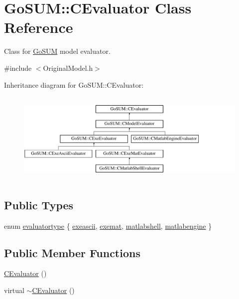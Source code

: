 \hypertarget{class_go_s_u_m_1_1_c_evaluator}{\section{Go\-S\-U\-M\-:\-:C\-Evaluator Class Reference}
\label{class_go_s_u_m_1_1_c_evaluator}
}


Class for \hyperlink{struct_go_s_u_m}{Go\-S\-U\-M} model evaluator.  




{\ttfamily \#include $<$Original\-Model.\-h$>$}

Inheritance diagram for Go\-S\-U\-M\-:\-:C\-Evaluator\-:\begin{figure}[H]
\begin{center}
\leavevmode
\includegraphics[height=4.465710cm]{class_go_s_u_m_1_1_c_evaluator}
\end{center}
\end{figure}
\subsection*{Public Types}
\begin{DoxyCompactItemize}
\item 
enum \hyperlink{class_go_s_u_m_1_1_c_evaluator_a50058cbf6a2c5b94677045ee02b67db2}{evaluatortype} \{ \hyperlink{class_go_s_u_m_1_1_c_evaluator_a50058cbf6a2c5b94677045ee02b67db2aedc52357596b711794cd5bac1aaf813f}{exeascii}, 
\hyperlink{class_go_s_u_m_1_1_c_evaluator_a50058cbf6a2c5b94677045ee02b67db2a0d57d51307eeadeacbfc6714ba003cf6}{exemat}, 
\hyperlink{class_go_s_u_m_1_1_c_evaluator_a50058cbf6a2c5b94677045ee02b67db2a5d73ae80ffe4497b6d5989bf05321da9}{matlabshell}, 
\hyperlink{class_go_s_u_m_1_1_c_evaluator_a50058cbf6a2c5b94677045ee02b67db2aff1ccecb2d33139472f45b9b1e2e63c5}{matlabengine}
 \}
\end{DoxyCompactItemize}
\subsection*{Public Member Functions}
\begin{DoxyCompactItemize}
\item 
\hyperlink{class_go_s_u_m_1_1_c_evaluator_ab61245188502828a2fdfa2f16fba9dea}{C\-Evaluator} ()
\item 
virtual \hyperlink{class_go_s_u_m_1_1_c_evaluator_a4b7f440821f62b112af66bae55f800b6}{$\sim$\-C\-Evaluator} ()
\end{DoxyCompactItemize}
